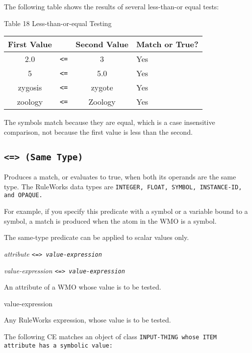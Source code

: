 \Example

The following table shows the results of several less-than-or equal
tests:

Table 18 Less-than-or-equal Testing

\begin{tabularx}{\columnwidth}{cccX}
  \toprule
  First Value &   & Second Value & Match or True? \\
  \midrule
  2.0         & \verb|<=| & 3            & Yes \\
  5           & \verb|<=| & 5.0          & Yes \\
  zygosis     & \verb|<=| & zygote       & Yes \\
  zoology     & \verb|<=| & Zoology      & Yes \\
  \bottomrule
\end{tabularx}

The symbols match because they are equal, which is a case insensitive
comparison, not because the first value is less than the second.

\subsection{\tt{<=>} (Same Type)}

Produces a match, or evaluates to true, when both its operands are the
same type. The RuleWorks data types are \tt{INTEGER}, \tt{FLOAT},
\tt{SYMBOL}, \tt{INSTANCE-ID}, and \tt{OPAQUE}.

For example, if you specify this predicate with a symbol or a variable
bound to a symbol, a match is produced when the atom in the WMO is a
symbol.

The same-type predicate can be applied to scalar values only.

\Format

\ct\it{attribute} \tt{<=>} \it{value-expression}

\it{value-expression} \tt{<=>} \it{value-expression}

An attribute of a WMO whose value is to be tested.

\begin{arguments}
\item[value-expression]
  
  Any RuleWorks expression, whose value is to be tested.
\end{arguments}

\Example

The following CE matches an object of class \tt{INPUT-THING} whose
\ct\tt{ITEM} attribute has a symbolic value:

